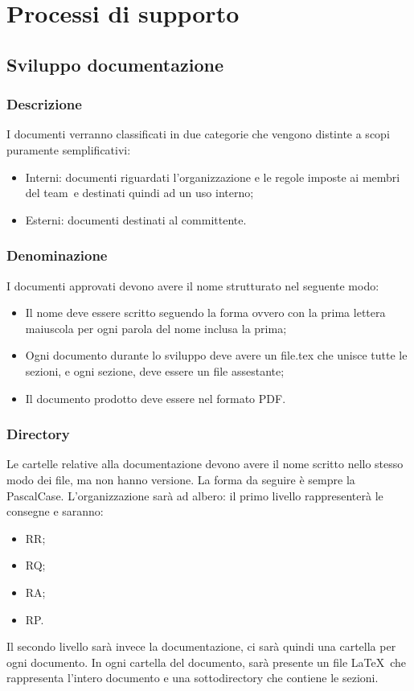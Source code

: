 \documentclass[../NormeDiProgetto.tex]{subfiles}
\begin{document}
\section{Processi di supporto}
\subsection{Sviluppo documentazione}
\subsubsection{Descrizione}
I documenti verranno classificati in due categorie che vengono distinte a scopi puramente semplificativi:
\begin{itemize}
\item Interni: documenti riguardati l'organizzazione e le regole imposte ai membri del team\ e destinati quindi ad un uso interno;
\item Esterni: documenti destinati al committente.
\end{itemize}
\subsubsection{Denominazione}
I documenti approvati devono avere il nome strutturato nel seguente modo:
\begin{itemize}
\item Il nome deve essere scritto seguendo la forma  ovvero con la prima lettera maiuscola per ogni parola del nome inclusa la prima;
\item Ogni documento durante lo sviluppo deve avere un file.tex che unisce tutte le sezioni, e ogni sezione, deve essere un file assestante;
\item Il documento prodotto deve essere nel formato PDF.
\end{itemize}
\subsubsection{Directory}
Le cartelle relative alla documentazione devono avere il nome scritto nello stesso modo dei file, ma non hanno versione. La forma da seguire è sempre la PascalCase.
L'organizzazione sarà ad albero: il primo livello rappresenterà le consegne e saranno:
\begin{itemize}
\item RR;
\item RQ;
\item RA;
\item RP.
\end{itemize}
Il secondo livello sarà invece la documentazione, ci sarà quindi una cartella per ogni documento.
In ogni cartella del documento, sarà presente un file \LaTeX\ che rappresenta l'intero documento e una sottodirectory che contiene le sezioni.
\end{document}
